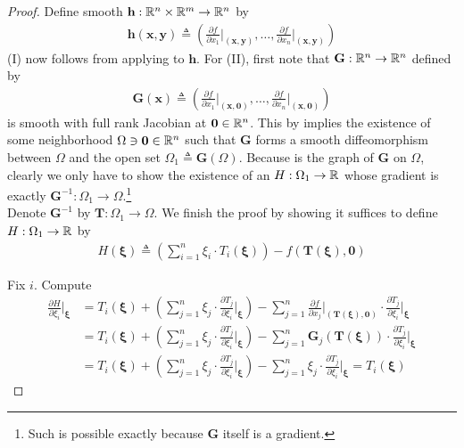 \documentclass{report}
\begin{document}
\begin{proof}
Define smooth $\textbf{h}:\mathbb{R}^n \times \mathbb{R}^m \rightarrow \mathbb{R}^n$ by 
\begin{align*}
\textbf{h}(\textbf{x},\textbf{y})\triangleq \left( \frac{\partial f}{\partial x_1} \bigg |_{(\textbf{x},\textbf{y})} , \dots ,\frac{\partial f}{\partial x_n} \bigg |_{(\textbf{x},\textbf{y})} \right)
\end{align*}
(I) now follows from applying  to $\textbf{h}$. For (II), first note that $\textbf{G}: \mathbb{R}^n \rightarrow \mathbb{R}^n$ defined by 
\begin{align*}
\textbf{G}(\textbf{x})\triangleq \left( \frac{\partial f}{\partial x_1} \bigg|_{(\textbf{x},\textbf{0})}, \dots ,\frac{\partial f}{\partial x_n} \bigg|_{(\textbf{x},\textbf{0})} \right)
\end{align*}
is smooth with full rank Jacobian at $\textbf{0}\in\mathbb{R}^n$. This by  implies the existence of some neighborhood $\Omega \ni \textbf{0}\in \mathbb{R}^n$ such that $\textbf{G}$ forms a smooth diffeomorphism between $\Omega$ and the open set $\Omega_1 \triangleq \textbf{G}(\Omega)$. Because  is the graph of $\textbf{G}$ on $\Omega$, clearly we only have to show the existence of an $H:\Omega_1\rightarrow \mathbb{R} $ whose gradient is exactly $\textbf{G}^{-1}:\Omega_1 \rightarrow \Omega$.\footnote{Such is possible exactly because $\textbf{G}$ itself is a gradient.}\\

Denote $\textbf{G}^{-1}$ by $\textbf{T}: \Omega_1\rightarrow \Omega$. We finish the proof by showing it suffices to define $H:\Omega_1 \rightarrow \mathbb{R}$ by 
\begin{align*}
H(\boldsymbol{\xi})\triangleq \left(\sum_{i=1}^n \xi_i \cdot T_i (\boldsymbol{\xi}) \right)  - f\left(\textbf{T}(\boldsymbol{\xi}) , \textbf{0}\right) 
\end{align*}

Fix $i$. Compute 
 \begin{align*}
\frac{\partial H}{\partial \xi_i} \bigg|_{\boldsymbol{\xi}}&= T_i(\boldsymbol{\xi})+ \left(\sum_{j=1}^n \xi_j \cdot \frac{\partial T_j}{\partial \xi_i } \bigg |_{\boldsymbol{\xi}}  \right) - \sum_{j=1}^n \frac{\partial f}{\partial x_j} \bigg|_{\left(\textbf{T}(\boldsymbol{\xi}), \textbf{0} \right)}  \cdot \frac{\partial T_j}{\partial \xi_i} \bigg|_{\boldsymbol{\xi}}\\
&=T_i(\boldsymbol{\xi})+ \left(\sum_{j=1}^n \xi_j \cdot \frac{\partial T_j}{\partial \xi_i } \bigg |_{\boldsymbol{\xi}}  \right)  - \sum_{j=1}^n \textbf{G}_j\left(\textbf{T}(\boldsymbol{\xi}) \right)  \cdot \frac{\partial T_j}{\partial \xi_i} \bigg|_{\boldsymbol{\xi}} \\
&=T_i(\boldsymbol{\xi})+ \left(\sum_{j=1}^n \xi_j \cdot \frac{\partial T_j}{\partial \xi_i } \bigg |_{\boldsymbol{\xi}}  \right)     - \sum_{j=1}^n \xi_j \cdot \frac{\partial T_j}{\partial \xi_i} \bigg|_{\boldsymbol{\xi}} = T_i(\boldsymbol{\xi})
\end{align*}

\end{proof}
\end{document}
